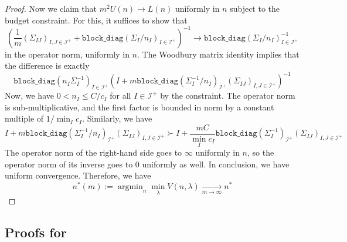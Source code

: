 \documentclass{article} %
\newtheorem{lemma}[lemma]{Lemma}
\DeclareMathOperator{\argmin}{argmin}
\begin{document}
\begin{proof}
Now we claim that $m^2 U(n)\rightarrow L(n)$ uniformly in $n$ subject to the budget constraint. For this, it suffices to show that
\[
\left(\frac{1}{m}(\Sigma_{IJ})_{I,J\in\mathcal{I}^+}+\texttt{block\_diag}(\Sigma_I/n_I)_{I\in\mathcal{I}^+}\right)^{-1} \to \texttt{block\_diag}(\Sigma_I/n_I)_{I\in\mathcal{I}^+}^{-1}
\]
in the operator norm, uniformly in $n$. The Woodbury matrix identity implies that the difference is exactly
\[
\texttt{block\_diag}(n_I\Sigma_I^{-1})_{I\in\mathcal{I}^+} (I+m\texttt{block\_diag}(\Sigma_I^{-1}/n_I)_{\mathcal{I}^+}(\Sigma_{IJ})_{I,J\in\mathcal{I}^+})^{-1}
\]
Now, we have $0<n_I\leq C/c_I$ for all $I\in\mathcal{I}^+$ by the constraint. The operator norm is sub-multiplicative, and the first factor is bounded in norm by a constant multiple of $1/\min_I c_I$. Similarly, we have
\[
I+m\texttt{block\_diag}(\Sigma_I^{-1}/n_I)_{\mathcal{I}^+}(\Sigma_{IJ})_{I,J\in\mathcal{I}^+} \succ I+\frac{mC}{\min_I c_I}\texttt{block\_diag}(\Sigma_I^{-1})_{\mathcal{I}^+}(\Sigma_{IJ})_{I,J\in\mathcal{I}^+}
\]
The operator norm of the right-hand side goes to $\infty$ uniformly in $n$, so the operator norm of its inverse goes to $0$ uniformly as well. In conclusion, we have uniform convergence. Therefore, we have
\[
n^*(m):=\argmin_n \min_\lambda V(n,\lambda)\xrightarrow[m\to\infty]{} n^*
\]
\end{proof}

\subsection{Proofs for }


    
\end{document}
